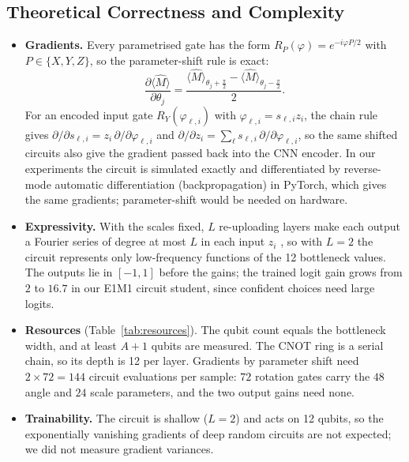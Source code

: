 \documentclass[10pt, a4paper]{article}
\begin{document}
\subsection{Theoretical Correctness and Complexity}
\begin{itemize}
    \item \textbf{Gradients.} Every parametrised gate has the form $R_P(\varphi)=e^{-i\varphi P/2}$ with $P\in\{X,Y,Z\}$, so the parameter-shift rule is exact:
    \begin{equation}
        \frac{\partial \langle \hat{M} \rangle}{\partial \theta_j} = \frac{\langle \hat{M} \rangle_{\theta_j + \frac{\pi}{2}} - \langle \hat{M} \rangle_{\theta_j - \frac{\pi}{2}}}{2}.
    \end{equation}
    For an encoded input gate $R_Y(\varphi_{\ell,i})$ with $\varphi_{\ell,i}=s_{\ell,i}z_i$, the chain rule gives $\partial/\partial s_{\ell,i}=z_i\,\partial/\partial\varphi_{\ell,i}$ and $\partial/\partial z_i=\sum_\ell s_{\ell,i}\,\partial/\partial\varphi_{\ell,i}$, so the same shifted circuits also give the gradient passed back into the CNN encoder.
    In our experiments the circuit is simulated exactly and differentiated by reverse-mode automatic differentiation (backpropagation) in PyTorch, which gives the same gradients; parameter-shift would be needed on hardware.
    \item \textbf{Expressivity.} With the scales fixed, $L$ re-uploading layers make each output a Fourier series of degree at most $L$ in each input $z_i$ \cite{schuld_expressive_2021}, so with $L=2$ the circuit represents only low-frequency functions of the 12 bottleneck values. The outputs lie in $[-1,1]$ before the gains; the trained logit gain grows from $2$ to $16.7$ in our E1M1 circuit student, since confident choices need large logits.
    \item \textbf{Resources} (Table~\ref{tab:resources}). The qubit count equals the bottleneck width, and at least $A+1$ qubits are measured. The CNOT ring is a serial chain, so its depth is 12 per layer. Gradients by parameter shift need $2\times72=144$ circuit evaluations per sample: $72$ rotation gates carry the $48$ angle and $24$ scale parameters, and the two output gains need none.
    \item \textbf{Trainability.} The circuit is shallow ($L=2$) and acts on 12 qubits, so the exponentially vanishing gradients of deep random circuits \cite{mcclean_barren_2018} are not expected; we did not measure gradient variances.
\end{itemize}
\end{document}
